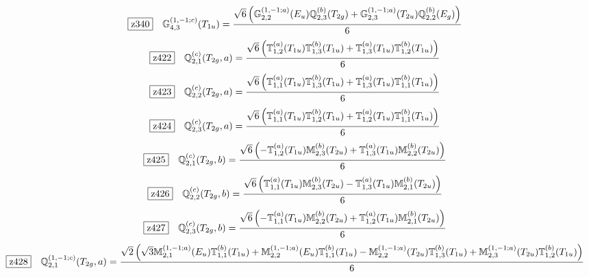 \documentclass[fleqn,10pt,landscape]{jsarticle}
\begin{document}
\begin{dmath*}
\hspace*{3mm}\fbox{z340}\quad \mathbb{G}_{4,3}^{(1,-1;c)}(T_{1u})=\frac{\sqrt{6} \left(\mathbb{G}_{2,2}^{(1,-1;a)}(E_{u}) \mathbb{Q}_{2,3}^{(b)}(T_{2g}) + \mathbb{G}_{2,3}^{(1,-1;a)}(T_{2u}) \mathbb{Q}_{2,2}^{(b)}(E_{g})\right)}{6}
\end{dmath*}
\begin{dmath*}
\hspace*{3mm}\fbox{z422}\quad \mathbb{Q}_{2,1}^{(c)}(T_{2g},a)=\frac{\sqrt{6} \left(\mathbb{T}_{1,2}^{(a)}(T_{1u}) \mathbb{T}_{1,3}^{(b)}(T_{1u}) + \mathbb{T}_{1,3}^{(a)}(T_{1u}) \mathbb{T}_{1,2}^{(b)}(T_{1u})\right)}{6}
\end{dmath*}
\begin{dmath*}
\hspace*{3mm}\fbox{z423}\quad \mathbb{Q}_{2,2}^{(c)}(T_{2g},a)=\frac{\sqrt{6} \left(\mathbb{T}_{1,1}^{(a)}(T_{1u}) \mathbb{T}_{1,3}^{(b)}(T_{1u}) + \mathbb{T}_{1,3}^{(a)}(T_{1u}) \mathbb{T}_{1,1}^{(b)}(T_{1u})\right)}{6}
\end{dmath*}
\begin{dmath*}
\hspace*{3mm}\fbox{z424}\quad \mathbb{Q}_{2,3}^{(c)}(T_{2g},a)=\frac{\sqrt{6} \left(\mathbb{T}_{1,1}^{(a)}(T_{1u}) \mathbb{T}_{1,2}^{(b)}(T_{1u}) + \mathbb{T}_{1,2}^{(a)}(T_{1u}) \mathbb{T}_{1,1}^{(b)}(T_{1u})\right)}{6}
\end{dmath*}
\begin{dmath*}
\hspace*{3mm}\fbox{z425}\quad \mathbb{Q}_{2,1}^{(c)}(T_{2g},b)=\frac{\sqrt{6} \left(- \mathbb{T}_{1,2}^{(a)}(T_{1u}) \mathbb{M}_{2,3}^{(b)}(T_{2u}) + \mathbb{T}_{1,3}^{(a)}(T_{1u}) \mathbb{M}_{2,2}^{(b)}(T_{2u})\right)}{6}
\end{dmath*}
\begin{dmath*}
\hspace*{3mm}\fbox{z426}\quad \mathbb{Q}_{2,2}^{(c)}(T_{2g},b)=\frac{\sqrt{6} \left(\mathbb{T}_{1,1}^{(a)}(T_{1u}) \mathbb{M}_{2,3}^{(b)}(T_{2u}) - \mathbb{T}_{1,3}^{(a)}(T_{1u}) \mathbb{M}_{2,1}^{(b)}(T_{2u})\right)}{6}
\end{dmath*}
\begin{dmath*}
\hspace*{3mm}\fbox{z427}\quad \mathbb{Q}_{2,3}^{(c)}(T_{2g},b)=\frac{\sqrt{6} \left(- \mathbb{T}_{1,1}^{(a)}(T_{1u}) \mathbb{M}_{2,2}^{(b)}(T_{2u}) + \mathbb{T}_{1,2}^{(a)}(T_{1u}) \mathbb{M}_{2,1}^{(b)}(T_{2u})\right)}{6}
\end{dmath*}
\begin{dmath*}
\hspace*{3mm}\fbox{z428}\quad \mathbb{Q}_{2,1}^{(1,-1;c)}(T_{2g},a)=\frac{\sqrt{2} \left(\sqrt{3} \mathbb{M}_{2,1}^{(1,-1;a)}(E_{u}) \mathbb{T}_{1,1}^{(b)}(T_{1u}) + \mathbb{M}_{2,2}^{(1,-1;a)}(E_{u}) \mathbb{T}_{1,1}^{(b)}(T_{1u}) - \mathbb{M}_{2,2}^{(1,-1;a)}(T_{2u}) \mathbb{T}_{1,3}^{(b)}(T_{1u}) + \mathbb{M}_{2,3}^{(1,-1;a)}(T_{2u}) \mathbb{T}_{1,2}^{(b)}(T_{1u})\right)}{6}
\end{dmath*}
\end{document}
